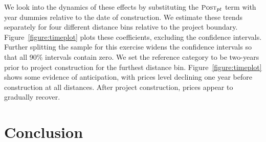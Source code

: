 \documentclass[12pt]{article}
\begin{document}
We look into the dynamics of these effects by substituting the $\textsc{\small Post}_{pt}$ term with year dummies relative to the date of construction. We estimate these trends separately for four different distance bins relative to the project boundary.  Figure~\ref{figure:timeplot} plots these coefficients, excluding the confidence intervals.  Further splitting the sample for this exercise widens the confidence intervals so that all 90\% intervals contain zero.  We set the reference category to be two-years prior to project construction for the furthest distance bin. Figure~\ref{figure:timeplot} shows some evidence of anticipation, with prices level declining one year before construction at all distances. After project construction, prices appear to gradually recover. %








\section{Conclusion}\label{section:discussion}
\end{document}
